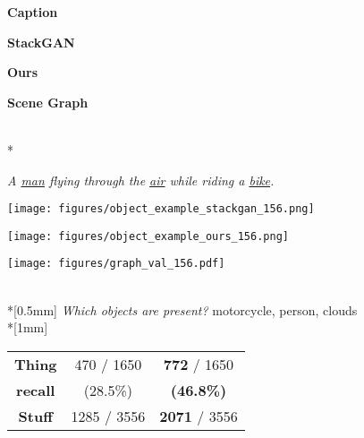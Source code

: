 \documentclass[10pt,twocolumn,letterpaper]{article}
\begin{document}
\begin{figure}
  \centering
  \begin{minipage}{0.09\textwidth}
    \centering
    \textbf{Caption}
  \end{minipage}
  \begin{minipage}{0.11\textwidth}
    \centering
    \textbf{StackGAN~\cite{zhang2017stackgan}}
  \end{minipage}
  \begin{minipage}{0.11\textwidth}
    \centering
    \textbf{Ours}
  \end{minipage}
  \begin{minipage}{0.115\textwidth}
    \centering
    \textbf{Scene Graph}
  \end{minipage} \\*
  \begin{minipage}[b]{0.09\textwidth}
    \centering
    \footnotesize
    \textit{A \underline{man} flying through the \underline{air} while riding a \underline{bike}.}
    \vspace{2mm}
  \end{minipage}
  \begin{minipage}[b]{0.11\textwidth}
    \texttt{[image: figures/object\_example\_stackgan\_156.png]}
  \end{minipage}
  \begin{minipage}[b]{0.11\textwidth}
    \texttt{[image: figures/object\_example\_ours\_156.png]}
  \end{minipage}
  \begin{minipage}[b]{0.115\textwidth}
    \centering
    \texttt{[image: figures/graph\_val\_156.pdf]}
  \end{minipage} \\*[0.5mm]
  {\footnotesize
    \hspace{-16mm}\textit{Which objects are present?} motorcycle, person, clouds \\*[1mm]}
  \hspace*{-17mm}\begin{tabular}{c|cc}
    \hline
    \textbf{Thing}   & \hspace{1mm} 470 / 1650 \hspace{1mm} & \hspace{1mm} \textbf{772} / 1650 \hspace{1mm} \\
    \textbf{recall}  & (28.5\%)   & \textbf{(46.8\%)} \\
    \hline
    \textbf{Stuff}   & 1285 / 3556 & \textbf{2071} / 3556 \\

\end{tabular}
\end{figure}
\end{document}
